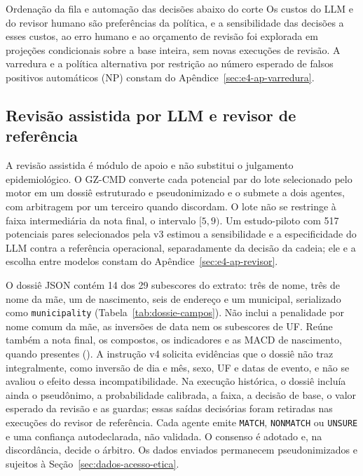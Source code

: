 \begin{chapter}{Ordenação da fila e automação das decisões abaixo do corte}
Os custos do LLM e do revisor humano são preferências da política, e a sensibilidade das decisões a esses custos, ao erro humano e ao orçamento de revisão foi explorada em projeções condicionais sobre a base inteira, sem novas execuções de revisão. A varredura e a política alternativa por restrição ao número esperado de falsos positivos automáticos (NP) constam do Apêndice~\ref{sec:e4-ap-varredura}.

\subsection{Revisão assistida por LLM e revisor de referência}\label{sec:e4-revisao-assistida}\label{sec:e4-protocolo-llm}

A revisão assistida é módulo de apoio e não substitui o julgamento epidemiológico. O GZ-CMD converte cada potencial par do lote selecionado pelo motor em um dossiê estruturado e pseudonimizado e o submete a dois agentes, com arbitragem por um terceiro quando discordam. O lote não se restringe à faixa intermediária da nota final, o intervalo $[5,9)$. Um estudo-piloto com 517 potenciais pares selecionados pela v3 estimou a sensibilidade e a especificidade do LLM contra a referência operacional, separadamente da decisão da cadeia; ele e a escolha entre modelos constam do Apêndice~\ref{sec:e4-ap-revisor}.

O dossiê JSON contém 14 dos 29 subescores do extrato: três de nome, três de nome da mãe, um de nascimento, seis de endereço e um municipal, serializado como \texttt{municipality} (Tabela~\ref{tab:dossie-campos}). Não inclui a penalidade por nome comum da mãe, as inversões de data nem os subescores de UF. Reúne também a nota final, os compostos, os indicadores e as MACD de nascimento, quando presentes (). A instrução v4 solicita evidências que o dossiê não traz integralmente, como inversão de dia e mês, sexo, UF e datas de evento, e não se avaliou o efeito dessa incompatibilidade. Na execução histórica, o dossiê incluía ainda o pseudônimo, a probabilidade calibrada, a faixa, a decisão de base, o valor esperado da revisão e as guardas; essas saídas decisórias foram retiradas nas execuções do revisor de referência. Cada agente emite \texttt{MATCH}, \texttt{NONMATCH} ou \texttt{UNSURE} e uma confiança autodeclarada, não validada. O consenso é adotado e, na discordância, decide o árbitro. Os dados enviados permanecem pseudonimizados e sujeitos à Seção~\ref{sec:dados-acesso-etica}.




\end{chapter}

